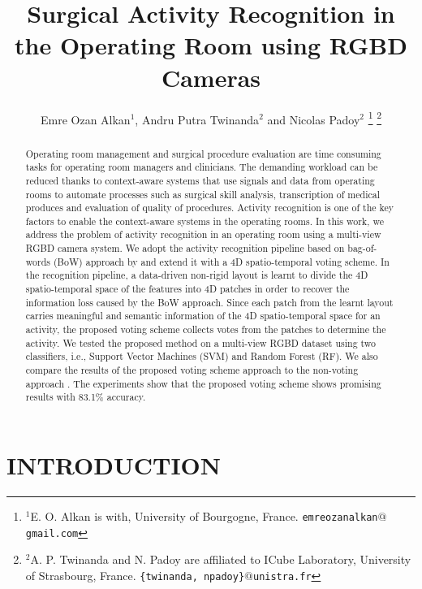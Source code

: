 \documentclass[a4paper, 10pt, conference]{ieeeconf}      %
\title{\LARGE \bf
Surgical Activity Recognition in the Operating Room using RGBD Cameras
}
\author{Emre Ozan Alkan$^{1}$, Andru Putra Twinanda$^{2}$ and Nicolas Padoy$^{2}$%
\thanks{$^{1}$E. O. Alkan is with,
        University of Bourgogne, France.
        {\tt\small emreozanalkan$@$gmail.com}}%
\thanks{$^{2}$A. P. Twinanda and N. Padoy are affiliated to ICube Laboratory, University of Strasbourg, France.
        {\tt\small \{twinanda, npadoy\}$@$unistra.fr}}%
}
\begin{document}
\maketitle
\thispagestyle{empty}
\pagestyle{empty}


\begin{abstract}

Operating room management and surgical procedure evaluation are time consuming tasks for operating room managers and clinicians. The demanding workload can be reduced thanks to context-aware systems that use signals and data from operating rooms to automate processes such as surgical skill analysis, transcription of medical produces and evaluation of quality of procedures. Activity recognition is one of the key factors to enable the context-aware systems in the operating rooms. In this work, we address the problem of activity recognition in an operating room using a multi-view RGBD camera system. We adopt the activity recognition pipeline based on bag-of-words (BoW) approach by \cite{c1} and extend it with a 4D spatio-temporal voting scheme.  In the recognition pipeline, a data-driven non-rigid layout is learnt to divide the 4D spatio-temporal space of the features into 4D patches in order to recover the information loss caused by the BoW approach. Since each patch from the learnt layout carries meaningful and semantic information of the 4D spatio-temporal space for an activity, the proposed voting scheme collects votes from the patches to determine the activity. We tested the proposed method on a multi-view RGBD dataset using two classifiers, i.e., Support Vector Machines (SVM) and Random Forest (RF). We also compare the results of the proposed voting scheme approach to the non-voting approach \cite{c1}. The experiments show that the proposed voting scheme shows promising results with 83.1\% accuracy.

\end{abstract}


\section{INTRODUCTION}
\label{sec:introduction}

\end{document}
